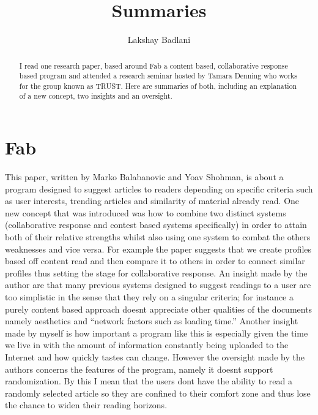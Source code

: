 \documentclass[12pt, oneside]{report}
\begin{document}
\title{Summaries}
\author{Lakshay Badlani}

\maketitle
\begin{abstract}
I read one research paper, based around Fab a content based, collaborative response based program  and attended a research seminar hosted by Tamara Denning who works for the group known as TRUST. Here are summaries of both, including an explanation of a new concept, two insights and an oversight.
\end{abstract}
\section{Fab}
This paper, written by Marko Balabanovic and Yoav Shohman, is about a program designed to suggest articles to readers depending on specific criteria such as user interests, trending articles and similarity of material already read. One new concept that was introduced was how to combine two distinct systems (collaborative response and contest based systems specifically) in order to attain both of their relative strengths whilst also using one system to combat the others weaknesses and vice versa. For example the paper suggests that we create profiles based off content read and then compare it to others in order to connect similar profiles thus setting the stage for collaborative response. An insight made by the author are that many previous systems designed to suggest readings to a user are too simplistic in the sense that they rely on a singular criteria; for instance a purely content based approach doesnt appreciate other qualities of the documents namely aesthetics and ``network factors such as loading time.'' Another insight made by myself is how important a program like this is especially given the time we live in with the amount of information constantly being uploaded to the Internet and how quickly tastes can change. However the oversight made by the authors concerns the features of the program, namely it doesnt support randomization. By this I mean that the users dont have the ability to read a randomly selected article so they are confined to their comfort zone and thus lose the chance to widen their reading horizons.
\end{document}
